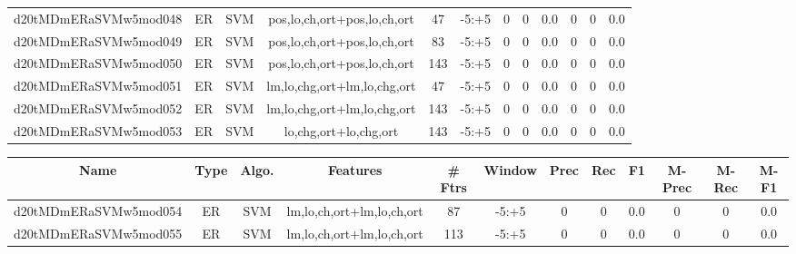 \documentclass[a4paper]{article}
\begin{document}
\begin{landscape}
\begin{center}
\begin{tabular}{ |c|c|c|c|c|c|c|c|c|c|c|c|}
 
 	
 	\small{ d20tMDmERaSVMw5mod048 } & ER & SVM & pos,lo,ch,ort+pos,lo,ch,ort  &  47 &  -5:+5  &  0 & 0 & 0.0  &  0 & 0 & 0.0 \\
 	

 
 	
 	\small{ d20tMDmERaSVMw5mod049 } & ER & SVM & pos,lo,ch,ort+pos,lo,ch,ort  &  83 &  -5:+5  &  0 & 0 & 0.0  &  0 & 0 & 0.0 \\
 	

 
 	
 	\small{ d20tMDmERaSVMw5mod050 } & ER & SVM & pos,lo,ch,ort+pos,lo,ch,ort  &  143 &  -5:+5  &  0 & 0 & 0.0  &  0 & 0 & 0.0 \\
 	

 
 	
 	\small{ d20tMDmERaSVMw5mod051 } & ER & SVM & lm,lo,chg,ort+lm,lo,chg,ort  &  47 &  -5:+5  &  0 & 0 & 0.0  &  0 & 0 & 0.0 \\
 	

 
 	
 	\small{ d20tMDmERaSVMw5mod052 } & ER & SVM & lm,lo,chg,ort+lm,lo,chg,ort  &  143 &  -5:+5  &  0 & 0 & 0.0  &  0 & 0 & 0.0 \\
 	

 
 	
 	\small{ d20tMDmERaSVMw5mod053 } & ER & SVM & lo,chg,ort+lo,chg,ort  &  143 &  -5:+5  &  0 & 0 & 0.0  &  0 & 0 & 0.0 \\
 	
 \hline
\end{tabular}
\end{center}




\begin{center}
\begin{tabular}{ |c|c|c|c|c|c|c|c|c|c|c|c|} 
 \hline
 	Name & Type & Algo. & Features & \# Ftrs & Window & Prec & Rec & F1 & M-Prec & M-Rec & M-F1\\
 \hline

 	

 
 	
 	\small{ d20tMDmERaSVMw5mod054 } & ER & SVM & lm,lo,ch,ort+lm,lo,ch,ort  &  87 &  -5:+5  &  0 & 0 & 0.0  &  0 & 0 & 0.0 \\
 	

 
 	
 	\small{ d20tMDmERaSVMw5mod055 } & ER & SVM & lm,lo,ch,ort+lm,lo,ch,ort  &  113 &  -5:+5  &  0 & 0 & 0.0  &  0 & 0 & 0.0 \\
 	


\end{tabular}
\end{center}
\end{landscape}
\end{document}
